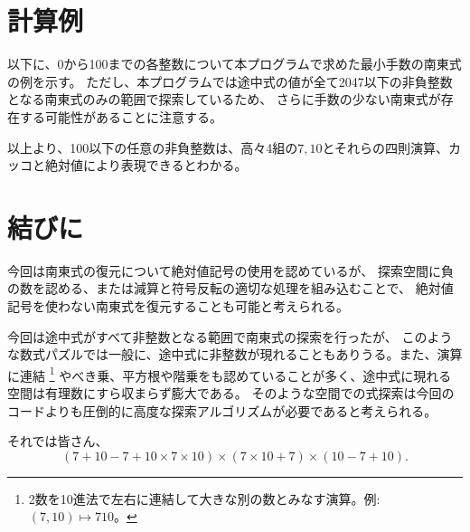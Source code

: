 \documentclass[10pt,dvipdfmx]{ujarticle}
\begin{document}
\section{計算例}
以下に、0から100までの各整数について本プログラムで求めた最小手数の南東式の例を示す。
ただし、本プログラムでは途中式の値が全て2047以下の非負整数となる南東式のみの範囲で探索しているため、
さらに手数の少ない南東式が存在する可能性があることに注意する。
\newpage


以上より、100以下の任意の非負整数は、高々4組の$7,10$とそれらの四則演算、カッコと絶対値により表現できるとわかる。
\section{結びに}
今回は南東式の復元について絶対値記号の使用を認めているが、
探索空間に負の数を認める、または減算と符号反転の適切な処理を組み込むことで、
絶対値記号を使わない南東式を復元することも可能と考えられる。

今回は途中式がすべて非整数となる範囲で南東式の探索を行ったが、
このような数式パズルでは一般に、途中式に非整数が現れることもありうる。また、演算に連結
\footnote{2数を10進法で左右に連結して大きな別の数とみなす演算。例: $(7, 10)\mapsto 710$。}
やべき乗、平方根や階乗をも認めていることが多く、途中式に現れる空間は有理数にすら収まらず膨大である。
そのような空間での式探索は今回のコードよりも圧倒的に高度な探索アルゴリズムが必要であると考えられる。

それでは皆さん、
\begin{equation*}
    (7+10-7+10\times7\times10)\times(7\times10+7)\times(10-7+10).
\end{equation*}
\printbibliography
\end{document}
